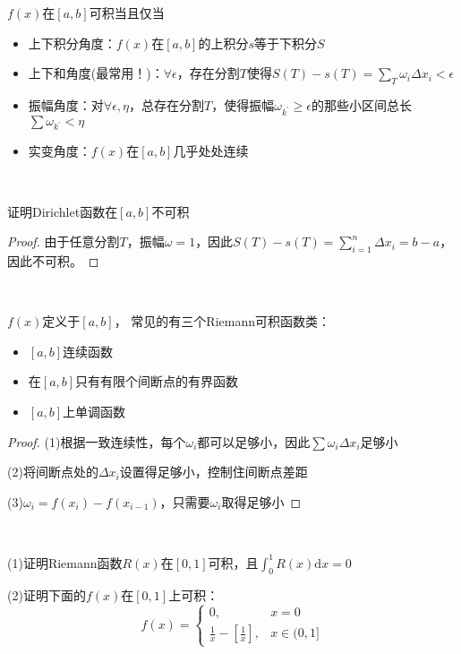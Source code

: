 \begin{theorem}[可积性充要条件]
  $f(x)$在$[a,b]$可积当且仅当
  \begin{itemize}
  \item 上下积分角度：$f(x)$在$[a,b]$的上积分$s$等于下积分$S$
  \item 上下和角度(最常用！)：$\forall \epsilon$，存在分割$T$使得$S(T) - s(T) = \sum\limits_T \omega_i \Delta x_i< \epsilon$
  \item 振幅角度：对$\forall \epsilon, \eta$，总存在分割$T$，使得振幅$\omega_{k^{\prime}} \geq \epsilon$的那些小区间总长$\sum\limits \omega_{k^{\prime}} < \eta$
  \item 实变角度：$f(x)$在$[a,b]$几乎处处连续
  \end{itemize}
\end{theorem}

~

\begin{exercise}[Dirichlet函数的不可积性]
  证明Dirichlet函数在$[a,b]$不可积
\end{exercise}

\begin{proof}
  由于任意分割$T$，振幅$\omega = 1$，因此$S(T) - s(T) = \sum\limits_{i = 1}^n \Delta x_i = b - a$，因此不可积。
\end{proof}

~

\begin{theorem}[Riemann可积函数类]
  $f(x)$定义于$[a,b]$，
  常见的有三个Riemann可积函数类：
  \begin{itemize}
  \item $[a,b]$连续函数
  \item 在$[a,b]$只有有限个间断点的有界函数
  \item $[a,b]$上单调函数
  \end{itemize}
\end{theorem}

\begin{proof}
  (1)根据一致连续性，每个$\omega_i$都可以足够小，因此$\sum \omega_i \Delta x_i$足够小

  (2)将间断点处的$\Delta x_i$设置得足够小，控制住间断点差距

  (3)$\omega_i = f(x_i) - f(x_{i-1})$，只需要$\omega_i$取得足够小
\end{proof}

~

\begin{exercise}[可积性判断]
  (1)证明Riemann函数$R(x)$在$[0,1]$可积，且$\int_0^1 R(x)\mathrm{d}x = 0$

  (2)证明下面的$f(x)$在$[0,1]$上可积：
  \begin{equation*}
    f(x) =
    \begin{cases}
      0, & x = 0\\
      \frac{1}{x} - \left[ \frac{1}{x} \right], & x \in (0,1]
    \end{cases}
  \end{equation*}
\end{exercise}

